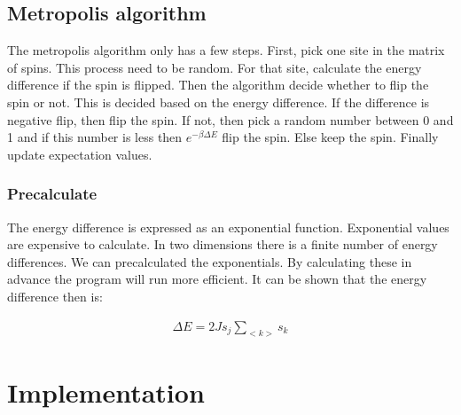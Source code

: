 
\subsection{Metropolis algorithm}\label{sec:metro}

The metropolis algorithm only has a few steps. First, pick one site in the matrix of spins. This process need to be random. For that site, calculate the energy difference if the spin is flipped. Then the algorithm decide whether to flip the spin or not. This is decided based on the energy difference. If the difference is negative flip, then flip the spin. If not, then pick a random number between 0 and 1 and if this number is less then $e^{-\beta \Delta E}$ flip the spin. Else keep the spin. Finally update expectation values.


\subsubsection{Precalculate}

The energy difference is expressed as an exponential function. Exponential values are expensive to calculate. In two dimensions there is a finite number of energy differences. We can precalculated the exponentials. By calculating these in advance the program will run more efficient. It can be shown that the energy difference then is\cite{compphys}:

\begin{align*}
	\Delta E = 2J s_j \sum_{<k>} s_k
\end{align*}






\pagebreak
\section{Implementation}


